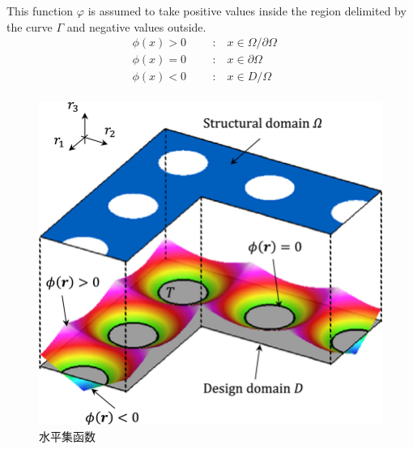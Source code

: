 \documentclass[lang=en,aspectratio=43,theme=default,logo=on]{simplebeamer}
\begin{document}
\begin{frame}[fragile]
    This function $\displaystyle \varphi$ is assumed to take positive values inside the region delimited by the curve $\displaystyle \Gamma$ and negative values outside.
    \begin{equation*}
        \begin{array}{cc} \phi (x) > 0\text{     :  }x \in \Omega / \partial \Omega  \\ \phi (x) = 0\text{     :  }x \in \partial \Omega \text{     } \\ \phi (x) < 0\text{     :  }x \in D/ \Omega  \\  \end{array}
    \end{equation*}
    \begin{figure}
        \centering %
        \includegraphics[height=0.5\textheight]{./img/Level-set-method-for-topology-optimization.png}
        \caption{水平集函数}
    \end{figure}
\end{frame}
\end{document}
